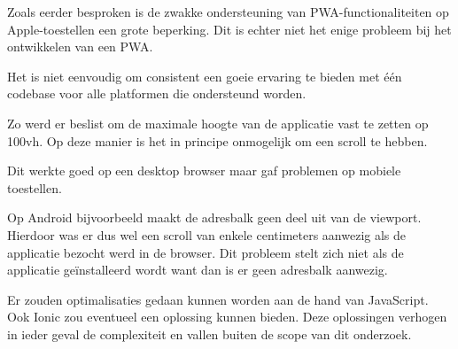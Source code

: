 		Zoals eerder besproken is de zwakke ondersteuning van PWA-functionaliteiten op Apple-toestellen een grote beperking. Dit is echter niet het enige probleem bij het ontwikkelen van een PWA.
			
		Het is niet eenvoudig om consistent een goeie ervaring te bieden met één codebase voor alle platformen die ondersteund worden. 
		
		Zo werd er beslist om de maximale hoogte van de applicatie vast te zetten op 100vh. Op deze manier is het in principe onmogelijk om een scroll te hebben.
		
		Dit werkte goed op een desktop browser maar gaf problemen op mobiele toestellen.
		
		Op Android bijvoorbeeld maakt de adresbalk geen deel uit van de viewport. Hierdoor was er dus wel een scroll van enkele centimeters aanwezig als de applicatie bezocht werd in de browser. Dit probleem stelt zich niet als de applicatie geïnstalleerd wordt want dan is er geen adresbalk aanwezig.
		

		Er zouden optimalisaties gedaan kunnen worden aan de hand van JavaScript. Ook Ionic zou eventueel een oplossing kunnen bieden. Deze oplossingen verhogen in ieder geval de complexiteit en vallen buiten de scope van dit onderzoek.
	
	
	
	
			
		